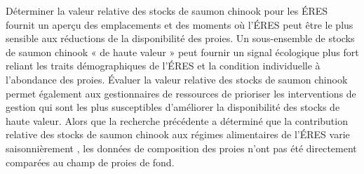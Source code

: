 Déterminer la valeur relative des stocks de saumon chinook pour les ÉRES fournit un aperçu des emplacements et des moments où l'ÉRES peut être le plus sensible aux réductions de la disponibilité des proies. Un sous-ensemble de stocks de saumon chinook « de haute valeur » peut fournir un signal écologique plus fort reliant les traits démographiques de l'ÉRES et la condition individuelle à l'abondance des proies. Évaluer la valeur relative des stocks de saumon chinook permet également aux gestionnaires de ressources de prioriser les interventions de gestion qui sont les plus susceptibles d'améliorer la disponibilité des stocks de haute valeur. Alors que la recherche précédente a déterminé que la contribution relative des stocks de saumon chinook aux régimes alimentaires de l'ÉRES varie saisonnièrement \citep{hansonSpeciesStockIdentification2010, hansonEndangeredPredatorsEndangered2021}, les données de composition des proies n'ont pas été directement comparées au champ de proies de fond.

